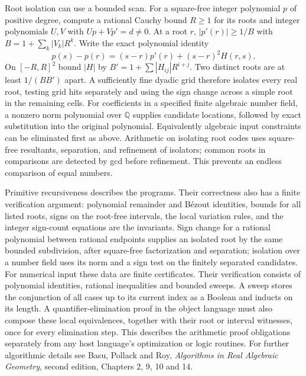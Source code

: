 \documentclass[10pt,letterpaper]{article}
\begin{document}
Root isolation can use a bounded scan. For a square-free integer
polynomial $p$ of positive degree, compute a rational Cauchy bound
$R\ge1$ for its roots and integer polynomials $U,V$ with
$Up+Vp'=d\ne0$. At a root $r$, $|p'(r)|\ge1/B$ with
$B=1+\sum_k|V_k|R^k$. Write the exact polynomial identity
\[
 p(s)-p(r)=(s-r)p'(r)+(s-r)^2H(r,s).
\]
On $[-R,R]^2$ bound $|H|$ by $B'=1+\sum|H_{ij}|R^{i+j}$.
Two distinct roots are at least $1/(BB')$ apart. A sufficiently
fine dyadic grid therefore isolates every real root, testing grid
hits separately and using the sign change across a simple root
in the remaining cells. For coefficients in a specified finite
algebraic number field, a nonzero norm polynomial over $\mathbb Q$
supplies candidate locations, followed by exact substitution into the
original polynomial. Equivalently algebraic input constraints can
be eliminated first as above. Arithmetic on isolating root codes
uses square-free resultants, separation, and refinement of isolators;
common roots in comparisons are detected by gcd before refinement.
This prevents an endless comparison of equal numbers.

Primitive recursiveness describes the programs. Their correctness also
has a finite verification argument: polynomial remainder and
Bézout identities, bounds for all listed roots, signs on the root-free
intervals, the local variation rules, and the integer sign-count
equations are the invariants. Sign change for a rational polynomial
between rational endpoints supplies an isolated root by the same
bounded subdivision, after square-free factorization and separation;
isolation over a number field uses its norm and a sign test on the
finitely separated candidates. For numerical input these data are
finite certificates. Their verification consists of polynomial
identities, rational inequalities and bounded sweeps. A sweep stores
the conjunction of all cases up to its current index as a Boolean
and inducts on its length. A quantifier-elimination proof in the
object language must also compose these local equivalences, together
with their root or interval witnesses, once for every elimination
step. This describes the arithmetic proof obligations separately from
any host language's optimization or logic routines. For further
algorithmic details see Basu, Pollack and Roy, \emph{Algorithms in
Real Algebraic Geometry}, second edition, Chapters 2, 9, 10 and 14.
\end{document}
